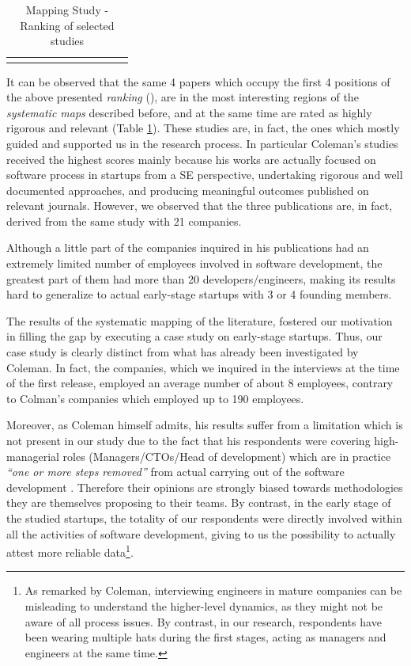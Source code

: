 \documentclass[final,5p,times,twocolumn]{elsarticle}
\begin{document}
\begin{longtable}{|l|c|c|c|c|c|c|c|c|c|c|}
 \hline
\caption{Mapping Study - Ranking of selected studies }\label{tab:ms:rig-rel-rank}\\
 \end{longtable}

\small
\twocolumn


It can be observed that the same 4 papers which occupy the first 4 positions of the above presented \textit{ranking} (\cite{Coleman2008,Coleman2008a,Coleman2007,Kajko-Mattsson2008}), are in the most interesting regions of the \textit{systematic maps} described before, and at the same time are rated as highly rigorous and relevant (Table \ref{tab:ms:rig-rel-rank}). These studies are, in fact, the ones which mostly guided and supported us in the research process. In particular Coleman's studies received the highest scores mainly because  his works are actually focused on software process in startups from a SE perspective, undertaking rigorous and well documented approaches, and producing meaningful outcomes published on relevant journals. However, we observed that the three publications are, in fact, derived from the same study with 21 companies.

Although a little part of the companies inquired in his publications had an extremely limited number of employees involved in software development, the greatest part of them had more than 20 developers/engineers, making its results hard to generalize to actual early-stage startups with 3 or 4 founding members.

The results of the systematic mapping of the literature, fostered our motivation in filling the gap by executing a case study on early-stage startups. Thus, our case study is clearly distinct from what has already been investigated by Coleman. In fact, the companies, which we inquired in the interviews at the time of the first release, employed an average number of about 8 employees, contrary to Colman's companies which employed up to 190 employees.

Moreover, as Coleman himself admits, his results suffer from a limitation which is not present in our study due to the fact that his respondents were covering high-managerial roles (Managers/CTOs/Head of development) which are in practice \textit{``one or more steps removed''} from actual carrying out of the software development \cite{Coleman2007}. Therefore their opinions are strongly biased towards methodologies they are themselves proposing to their teams. By contrast, in the early stage of the studied startups, the totality of our respondents were directly involved within all the activities of software development, giving to us the possibility to actually attest more reliable data\footnote{As remarked by Coleman, interviewing engineers in mature companies can be misleading to understand the higher-level dynamics, as they might not be aware of all process issues. By contrast, in our research, respondents have been wearing multiple hats during the first stages, acting as managers and engineers at the same time.}.
\end{document}
